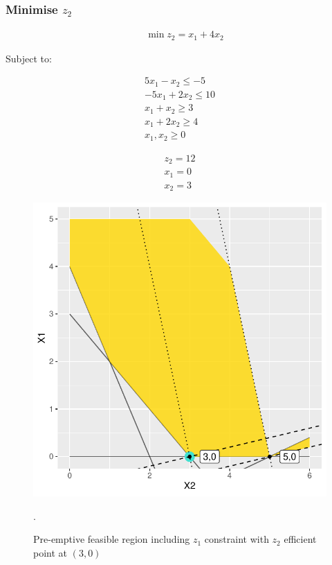 \documentclass[a4paper,11pt]{article}
\begin{document}
\subsubsection{Minimise $z_2$}

\begin{align}
	\quad \min z_2 = x_1 + 4x_2
\end{align}

Subject to:

\begin{align}
	5x_1 - x_2 \leq -5\\
	-5x_1 + 2x_2 \leq 10\\
	x_1 + x_2 \geq 3\\
	x_1 + 2x_2 \geq 4\\
	x_1,x_2 \geq 0
\end{align}

\begin{align}
	z_2 = 12 \\
	x_1 = 0 \\
	x_2 = 3
\end{align}

\begin{figure}[H]
    \centering
    \includegraphics{../R/Pre_emptive2}
    \caption{Pre-emptive feasible region including $z_1$ constraint with $z_2$ efficient point at $(3,0)$}.
    \label{eff_front}
\end{figure}
\end{document}
